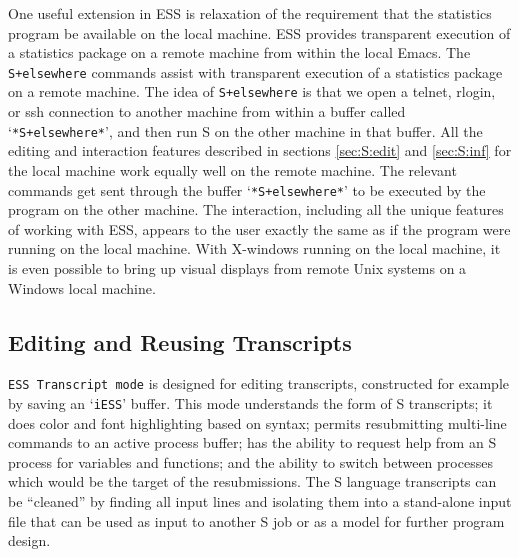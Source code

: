 \documentclass{article}
\newcommand{\stexttt}[1]{{\small\texttt{#1}}}
\newcommand{\file}[1]{`\stexttt{#1}'}
\begin{document}

One useful extension in ESS is relaxation of the requirement that the
statistics program %
be available on the local machine.  
ESS provides transparent execution of a statistics package on a remote
machine from within the local Emacs.  The
\stexttt{S+elsewhere} commands assist with transparent execution of a
statistics package on a remote machine.  The idea of
\stexttt{S+elsewhere} is that we open a telnet, rlogin, or ssh
connection to another machine from within a buffer called
\file{*S+elsewhere*}, and then run S on the other machine in that
buffer.  All the editing and interaction features described in
sections \ref{sec:S:edit} and \ref{sec:S:inf} for the local machine
work equally well on the remote machine.  The relevant commands get
sent through the buffer \file{*S+elsewhere*} to be executed by the
program on the other machine.  The interaction, including all the
unique features of working with ESS, appears to the user exactly the
same as if the program were running on the local machine.  With
X-windows running on the local machine, it is even possible to bring
up visual displays from remote Unix systems on a Windows local
machine.

\subsection{Editing and Reusing Transcripts}
\label{sec:S:trans}

\stexttt{ESS Transcript mode} is designed
for editing transcripts, constructed for example by saving
an \file{iESS} buffer.  This mode understands the form of S
transcripts; it does color and font highlighting based on syntax; permits 
resubmitting
multi-line commands to an active process buffer; has the ability to
request help from an S process for variables and functions; and the ability to
switch between processes which would be the target of the resubmissions.
The S language transcripts can be ``cleaned'' by
finding all input lines and isolating them into a stand-alone input file
that can be used as input to another S job or as a model for further
program design.
\end{document}

